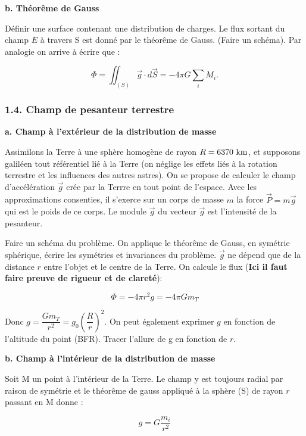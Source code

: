 \documentclass[french, a4paper, 10pt, twocolumn, landscape]{article}
\begin{document}
\textbf{b. Théorême de Gauss}

Définir une surface contenant une distribution de charges. Le flux sortant du champ $E$ à travers S est donné par le théorême de Gauss. (Faire un schéma). Par analogie on arrive à écrire que : 

\begin{equation}
  \Phi = \iint_{(S)}{\vec{g}\cdot d\vec{S}} = -4\pi G\sum_i{M_i}.
\end{equation}

\subsubsection*{1.4. Champ de pesanteur terrestre}
\textbf{a. Champ à l'extérieur de la distribution de masse}

Assimilons la Terre à une sphère homogène de rayon $R=6370~\rm km$, et supposons galiléen tout référentiel lié à la Terre (on néglige les effets liés à la rotation terrestre et les influences des autres astres). On se propose de calculer le champ d'accélération $\overrightarrow{g}$ crée par la Terrre en tout point de l'espace. Avec les approximations consenties, il s'exerce sur un corps de masse $m$ la force $\overrightarrow{P}=m\overrightarrow{g}$ qui est le poids de ce corps. Le module $\overrightarrow{g}$ du vecteur $\overrightarrow{g}$ est l'intensité de la pesanteur.\medskip

Faire un schéma du problème. On applique le théorême de Gauss, en symétrie sphérique, écrire les symétries et invariances du problème. $\vec{g}$ ne dépend que de la distance $r$ entre l'objet et le centre de la Terre. On calcule le flux (\textbf{Ici il faut faire preuve de rigueur et de clareté}): 

\begin{equation}
  \Phi = -4\pi r^2 g = -4\pi Gm_T
\end{equation}

Donc $g = \dfrac{Gm_T}{r^2} = g_0\left(\dfrac{R}{r}\right)^2$. On peut également exprimer $g$ en fonction de l'altitude du point (BFR).  Tracer l'allure de g en fonction de $r$.

\textbf{b. Champ à l'intérieur de la distribution de masse}

Soit M un point à l'intérieur de la Terre. Le champ y est toujours radial par raison de symétrie et le théorême de gauss appliqué à la sphère (S) de rayon $r$ passant en M donne : 

\begin{equation}
	g=G\dfrac{m_i}{r^2}
\end{equation}
\end{document}
